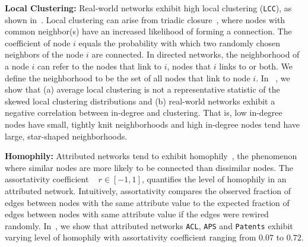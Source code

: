 \textbf{Local Clustering:}
Real-world networks exhibit high local clustering
(\texttt{LCC}), as shown in~. Local
clustering can arise from triadic closure~\cite{simmel1950sociology,
newman2001clustering}, where nodes with common neighbor(s) have an increased
likelihood of forming a connection.
The coefficient of node $i$ equals the probability with which two randomly chosen
neighbors of the node $i$ are connected. In directed networks, the neighborhood
of a node $i$ can refer to the nodes that link to $i$, nodes that
$i$ links to or both. We define the neighborhood to be the set
of all nodes that link to node $i$. In ~, we show that (a) average local clustering is not a
representative statistic of the skewed local clustering distributions and (b) real-world networks
exhibit a negative correlation between in-degree and clustering.
That is, low in-degree nodes have small, tightly knit neighborhoods
and high in-degree nodes tend have large, star-shaped neighborhoods.


\textbf{Homophily:}
Attributed networks tend to exhibit homophily~\cite{mcpherson2001birds}, the
phenomenon where similar nodes are more likely to be connected than dissimilar
nodes. The assortativity coefficient ~\cite{newman2002assortative} $r \in [-1,
1]$, quantifies the level of homophily in an attributed network.
Intuitively,
assortativity compares the observed fraction of edges between nodes with the same attribute
value to the expected fraction of edges between nodes with same attribute value
if the edges were rewired randomly. In~, we show that
attributed networks \texttt{ACL}, \texttt{APS} and \texttt{Patents} exhibit
varying level of homophily with assortativity coefficient ranging from $0.07$ to
$0.72$.

